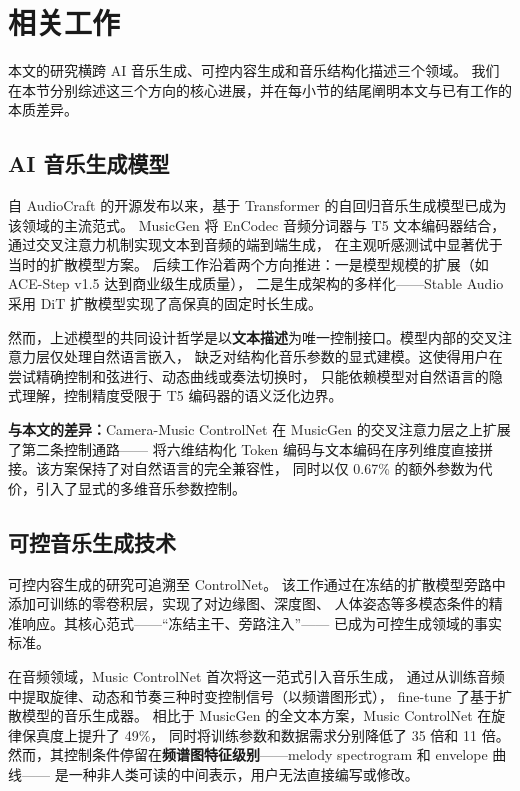 \documentclass[UTF8,12pt,a4paper]{ctexart}
\begin{document}
\section{相关工作}

本文的研究横跨 AI 音乐生成、可控内容生成和音乐结构化描述三个领域。
我们在本节分别综述这三个方向的核心进展，并在每小节的结尾阐明本文与已有工作的本质差异。

\subsection{AI 音乐生成模型}

自 AudioCraft\cite{musicgen} 的开源发布以来，基于 Transformer 的自回归音乐生成模型已成为该领域的主流范式。
MusicGen 将 EnCodec 音频分词器与 T5 文本编码器结合，通过交叉注意力机制实现文本到音频的端到端生成，
在主观听感测试中显著优于当时的扩散模型方案。
后续工作沿着两个方向推进：一是模型规模的扩展（如 ACE-Step v1.5\cite{acestep} 达到商业级生成质量），
二是生成架构的多样化——Stable Audio\cite{stableaudio} 采用 DiT 扩散模型实现了高保真的固定时长生成。

然而，上述模型的共同设计哲学是以\textbf{文本描述}为唯一控制接口。模型内部的交叉注意力层仅处理自然语言嵌入，
缺乏对结构化音乐参数的显式建模。这使得用户在尝试精确控制和弦进行、动态曲线或奏法切换时，
只能依赖模型对自然语言的隐式理解，控制精度受限于 T5 编码器的语义泛化边界。

\textbf{与本文的差异：}Camera-Music ControlNet 在 MusicGen 的交叉注意力层之上扩展了第二条控制通路——
将六维结构化 Token 编码与文本编码在序列维度直接拼接。该方案保持了对自然语言的完全兼容性，
同时以仅 0.67\% 的额外参数为代价，引入了显式的多维音乐参数控制。

\subsection{可控音乐生成技术}

可控内容生成的研究可追溯至 ControlNet\cite{controlnet}。
该工作通过在冻结的扩散模型旁路中添加可训练的零卷积层，实现了对边缘图、深度图、
人体姿态等多模态条件的精准响应。其核心范式——“冻结主干、旁路注入”——
已成为可控生成领域的事实标准。

在音频领域，Music ControlNet\cite{musiccontrolnet} 首次将这一范式引入音乐生成，
通过从训练音频中提取旋律、动态和节奏三种时变控制信号（以频谱图形式），
fine-tune 了基于扩散模型的音乐生成器。
相比于 MusicGen 的全文本方案，Music ControlNet 在旋律保真度上提升了 49\%，
同时将训练参数和数据需求分别降低了 35 倍和 11 倍。
然而，其控制条件停留在\textbf{频谱图特征级别}——melody spectrogram 和 envelope 曲线——
是一种非人类可读的中间表示，用户无法直接编写或修改。
\end{document}
